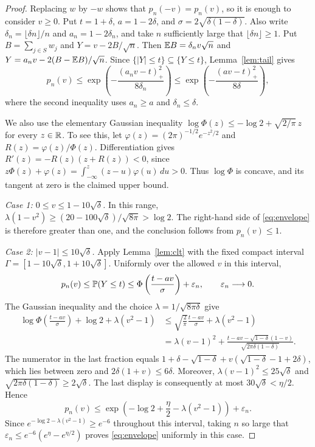 \documentclass[11pt,reqno]{amsart}
\begin{document}
\begin{proof}
Replacing $w$ by $-w$ shows that $p_n(-v)=p_n(v)$, so it is enough
to consider $v\ge0$. Put $t=1+\delta$, $a=1-2\delta$, and
$\sigma=2\sqrt{\delta(1-\delta)}$. Also write
$\delta_n=\lfloor\delta n\rfloor/n$ and $a_n=1-2\delta_n$,
and take $n$ sufficiently large that $\lfloor\delta n\rfloor\ge1$.
Put $B=\sum_{j\in S}w_j$ and $Y=v-2B/\sqrt n$. Then
${\mathbb{E}} B=\delta_n v\sqrt n$ and
$Y=a_nv-2(B-{\mathbb{E}} B)/\sqrt n$.
Since $\{|Y|\le t\}\subseteq\{Y\le t\}$, Lemma~\ref{lem:tail}
gives
\[
    p_n(v)
    \le\exp\left(-\frac{(a_nv-t)_+^2}{8\delta_n}\right)
    \le\exp\left(-\frac{(av-t)_+^2}{8\delta}\right),
\]
where the second inequality uses $a_n\ge a$ and $\delta_n\le\delta$.

We also use the elementary Gaussian inequality
$\log\Phi(z)\le-\log2+\sqrt{2/\pi}\,z$ for every $z\in{\mathbb{R}}$.
To see this, let $\varphi(z)=(2\pi)^{-1/2}e^{-z^2/2}$ and
$R(z)=\varphi(z)/\Phi(z)$. Differentiation gives
$R'(z)=-R(z)(z+R(z))<0$, since
$z\Phi(z)+\varphi(z)=\int_{-\infty}^z(z-u)\varphi(u)\,du>0$.
Thus $\log\Phi$ is concave, and its tangent at zero is the claimed
upper bound.

\medskip
\noindent\emph{Case 1: $0\le v\le1-10\sqrt\delta$.}
In this range,
$\lambda(1-v^2)\ge(20-100\sqrt\delta)/\sqrt{8\pi}>\log2$.
The right-hand side of \eqref{eq:envelope} is therefore greater
than one, and the conclusion follows from $p_n(v)\le1$.

\medskip
\noindent\emph{Case 2: $|v-1|\le10\sqrt\delta$.}
Apply Lemma~\ref{lem:clt} with the fixed compact interval
$\Gamma=[1-10\sqrt\delta,1+10\sqrt\delta]$. Uniformly over the
allowed $v$ in this interval,
\[
    p_n(v)\le{\mathbb{P}}(Y\le t)
    \le\Phi\left(\frac{t-av}{\sigma}\right)+\varepsilon_n,
    \qquad \varepsilon_n\longrightarrow0.
\]
The Gaussian inequality and the choice
$\lambda=1/\sqrt{8\pi\delta}$ give
\[
\begin{aligned}
    \log\Phi\left(\frac{t-av}{\sigma}\right)
       +\log2+\lambda(v^2-1)
    &\le \sqrt{\frac2\pi}\frac{t-av}{\sigma}
       +\lambda(v^2-1)\\
    &=\lambda(v-1)^2
      +\frac{t-av-\sqrt{1-\delta}(1-v)}
      {\sqrt{2\pi\delta(1-\delta)}}.
\end{aligned}
\]
The numerator in the last fraction equals
$1+\delta-\sqrt{1-\delta}
 +v(\sqrt{1-\delta}-1+2\delta)$, which lies between zero and
$2\delta(1+v)\le6\delta$. Moreover,
$\lambda(v-1)^2\le25\sqrt\delta$ and
$\sqrt{2\pi\delta(1-\delta)}\ge2\sqrt\delta$.
The last display is consequently at most
$30\sqrt\delta<\eta/2$. Hence
\[
    p_n(v)\le
    \exp\left(-\log2+\frac\eta2-\lambda(v^2-1)\right)
    +\varepsilon_n.
\]
Since $e^{-\log2-\lambda(v^2-1)}\ge e^{-6}$ throughout this
interval, taking $n$ so large that
$\varepsilon_n\le e^{-6}(e^\eta-e^{\eta/2})$ proves
\eqref{eq:envelope} uniformly in this case.


\end{proof}
\end{document}
